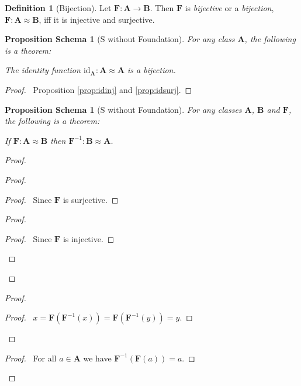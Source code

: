 \documentclass{book}
\let\qed\relax
\newtheorem{props}[ax]{Proposition Schema}
\theoremstyle{definition}
\newtheorem{df}[ax]{Definition}
\newcommand{\id}[1]{\ensuremath{\mathrm{id}_{#1}}}
\begin{document}
\begin{df}[Bijection]
Let $\mathbf{F} : \mathbf{A} \rightarrow \mathbf{B}$. Then $\mathbf{F}$ is \emph{bijective} or a \emph{bijection}, $\mathbf{F} : \mathbf{A} \approx \mathbf{B}$, iff it is injective and surjective.
\end{df}

\begin{props}[S without Foundation]
\label{prop:idbij}
For any class $\mathbf{A}$, the following is a theorem:

The identity function $\id{\mathbf{A}} : \mathbf{A} \approx \mathbf{A}$ is a bijection.
\end{props}

\begin{proof}
\pf\ Proposition \ref{prop:idinj} and \ref{prop:idsurj}. \qed	
\end{proof}

\begin{props}[S without Foundation]
\label{prop:invbij}
For any classes $\mathbf{A}$, $\mathbf{B}$ and $\mathbf{F}$, the following is a theorem:

If $\mathbf{F} : \mathbf{A} \approx \mathbf{B}$ then $\mathbf{F}^{-1} : \mathbf{B} \approx \mathbf{A}$.
\end{props}

\begin{proof}
\pf
{}
\begin{proof}
	\begin{proof}
		\pf\ Since $\mathbf{F}$ is surjective.
	\end{proof}
	\begin{proof}
		\begin{proof}
			\pf\ Since $\mathbf{F}$ is injective.
		\end{proof}
	\end{proof}
\end{proof}
\begin{proof}
	\begin{proof}
		\pf\ $x = \mathbf{F}(\mathbf{F}^{-1}(x)) = \mathbf{F}(\mathbf{F}^{-1}(y)) = y$.
	\end{proof}
\end{proof}
\begin{proof}
	\pf\ For all $a \in \mathbf{A}$ we have $\mathbf{F}^{-1}(\mathbf{F}(a)) = a$.
\end{proof}
\qed
\end{proof}
\end{document}
